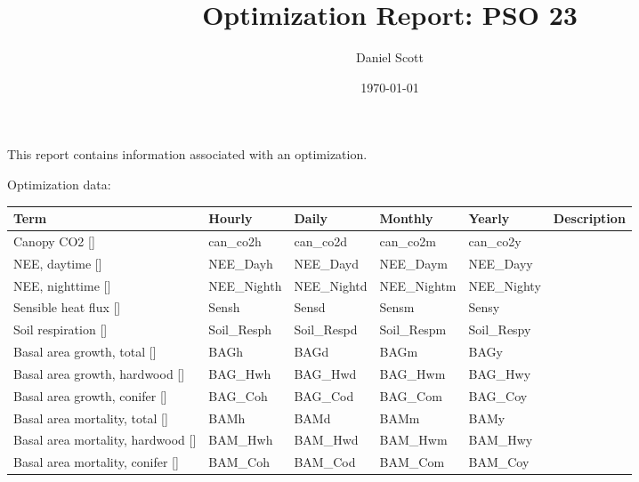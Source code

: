 \documentclass{article}
\title{Optimization Report: PSO 23}
\author{Daniel Scott}
\date{\today}
\begin{document}
\maketitle
This report contains information associated with an optimization.

Optimization data:
\begin{center}
    \begin{tabular}{ | l | l | l | l | l | p{3cm} |}
    \hline
    \bf{Term} & \bf{Hourly} & \bf{Daily} & \bf{Monthly} & \bf{Yearly} & \bf{Description} \\ \hline
    Canopy CO2 [] & can_co2h & can_co2d & can_co2m & can_co2y & \\ \hline
    NEE, daytime [] & NEE_Dayh & NEE_Dayd & NEE_Daym & NEE_Dayy & \\ \hline
    NEE, nighttime [] & NEE_Nighth & NEE_Nightd & NEE_Nightm & NEE_Nighty & \\ \hline
    Sensible heat flux [] & Sensh & Sensd & Sensm & Sensy & \\ \hline
    Soil respiration [] & Soil_Resph & Soil_Respd & Soil_Respm & Soil_Respy & \\ \hline
    Basal area growth, total [] & BAGh & BAGd & BAGm & BAGy & \\ \hline
    Basal area growth, hardwood [] & BAG_Hwh & BAG_Hwd & BAG_Hwm & BAG_Hwy & \\ \hline
    Basal area growth, conifer [] & BAG_Coh & BAG_Cod & BAG_Com & BAG_Coy & \\ \hline
    Basal area mortality, total [] & BAMh & BAMd & BAMm & BAMy & \\ \hline
    Basal area mortality, hardwood [] & BAM_Hwh & BAM_Hwd & BAM_Hwm & BAM_Hwy & \\ \hline
    Basal area mortality, conifer [] & BAM_Coh & BAM_Cod & BAM_Com & BAM_Coy & \\ \hline
    \hline
    \end{tabular}
\end{center}
\end{document}
